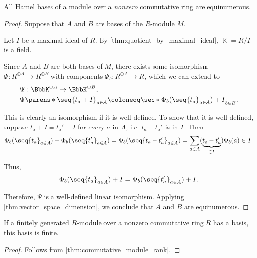 \begin{proposition}\label{thm:commutative_module_rank}
  All \hyperref[def:hamel_basis]{Hamel bases} of a \hyperref[def:module]{module} over a \emph{nonzero} \hyperref[def:ring/commutative]{commutative ring} are \hyperref[def:equinumerosity]{equinumerous}.
\end{proposition}
\begin{proof}
  Suppose that \( A \) and \( B \) are bases of the \( R \)-module \( M \).

  Let \( I \) be a \hyperref[def:semiring_ideal/maximal]{maximal ideal} of \( R \). By \cref{thm:quotient_by_maximal_ideal}, \( \BbbK = R / I \) is a field.

  Since \( A \) and \( B \) are both bases of \( M \), there exists some isomorphism \( \Phi: R^{\oplus A} \to R^{\oplus B} \) with components \( \Phi_b: R^{\oplus A} \to R \), which we can extend to
  \begin{equation*}
    \begin{aligned}
      &\Psi: \BbbK^{\oplus A} \to \BbbK^{\oplus B}, \\
      &\Psi\parens*{ \seq{ t_a + I }_{a \in A} } \coloneqq \seq*{ \Phi_b(\seq{ t_a }_{a \in A}) + I }_{b \in B}.
    \end{aligned}
  \end{equation*}

  This is clearly an isomorphism if it is well-defined. To show that it is well-defined, suppose \( t_a + I = t_a' + I \) for every \( a \) in \( A \), i.e. \( t_a - t_a' \) is in \( I \). Then
  \begin{equation*}
    \Phi_b(\seq{ t_a }_{a \in A}) - \Phi_b(\seq{ t_a' }_{a \in A})
    =
    \Phi_b(\seq{ t_a - t_a' }_{a \in A})
    =
    \sum_{a \in A} (\underbrace{ t_a - t_a' }_{\in I}) \Phi_b(a)
    \in
    I.
  \end{equation*}

  Thus,
  \begin{equation*}
    \Phi_b(\seq{ t_a }_{a \in A}) + I = \Phi_b(\seq{ t_a' }_{a \in A}) + I.
  \end{equation*}

  Therefore, \( \Psi \) is a well-defined linear isomorphism. Applying \cref{thm:vector_space_dimension}, we conclude that \( A \) and \( B \) are equinumerous.
\end{proof}

\begin{corollary}\label{thm:finitely_generated_module_basis}
  If a \hyperref[def:module/generated]{finitely generated} \( R \)-module over a nonzero commutative ring \( R \) has a \hyperref[def:hamel_basis]{basis}, this basis is finite.
\end{corollary}
\begin{proof}
  Follows from \cref{thm:commutative_module_rank}.
\end{proof}

